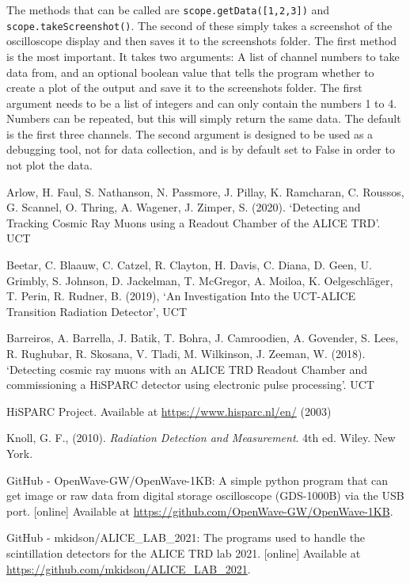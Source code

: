 \documentclass[11pt]{article}
\numberwithin{equation}{section}
\numberwithin{figure}{section}
\numberwithin{table}{section}
\begin{document}
\par The methods that can be called are \texttt{scope.getData([1,2,3])} and \texttt{scope.takeScreenshot()}. The second of these simply takes a screenshot of the oscilloscope display and then saves it to the screenshots folder. The first method is the most important. It takes two arguments: A list of channel numbers to take data from, and an optional boolean value that tells the program whether to create a plot of the output and save it to the screenshots folder. The first argument needs to be a list of integers and can only contain the numbers 1 to 4. Numbers can be repeated, but this will simply return the same data. The default is the first three channels. The second argument is designed to be used as a debugging tool, not for data collection, and is by default set to False in order to not plot the data.

\begin{thebibliography}{9}
     Arlow, H. Faul, S. Nathanson, N. Passmore, J. Pillay, K. Ramcharan, C. Roussos, G. Scannel, O. Thring, A. Wagener, J. Zimper, S. (2020). `Detecting and Tracking Cosmic Ray Muons using a Readout Chamber of the ALICE TRD'. UCT

     Beetar, C. Blaauw, C. Catzel, R. Clayton, H. Davis, C. Diana, D. Geen, U. Grimbly, S. Johnson, D. Jackelman, T. McGregor, A. Moiloa, K. Oelgeschl\"ager, T. Perin, R. Rudner, B. (2019), `An Investigation Into the UCT-ALICE Transition Radiation Detector', UCT
    
      Barreiros, A. Barrella, J. Batik, T. Bohra, J. Camroodien, A. Govender, S. Lees, R. Rughubar, R. Skosana, V. Tladi, M. Wilkinson, J. Zeeman, W. (2018). `Detecting cosmic ray muons with an ALICE TRD Readout Chamber and commissioning a HiSPARC detector using electronic pulse processing'. UCT

     HiSPARC Project. Available at \url{https://www.hisparc.nl/en/} (2003)

     Knoll, G. F., (2010). \textit{Radiation Detection and Measurement}. 4th ed. Wiley. New York.

     GitHub - OpenWave-GW/OpenWave-1KB: A simple python program that can get image or raw data from digital storage oscilloscope (GDS-1000B) via the USB port. [online] Available at \url{https://github.com/OpenWave-GW/OpenWave-1KB}.

     GitHub - mkidson/ALICE\_LAB\_2021: The programs used to handle the scintillation detectors for the ALICE TRD lab 2021. [online] Available at \url{https://github.com/mkidson/ALICE_LAB_2021}.

    
\end{thebibliography}
\end{document}
